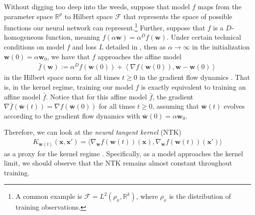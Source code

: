 \documentclass{article}
\begin{document}
Without digging too deep into the weeds, suppose that model $f$ maps from the parameter space $\mathbb{R}^p$ to Hilbert space $\mathcal{F}$ that represents  the space of possible functions our neural network can represent.\footnote{A common example is $\mathcal{F} = L^2(\rho_x, \mathbb{R}^k)$, where $\rho_x$ is the distribution of training observations.} Further, suppose that $f$ is a $D$-homogeneous function, meaning $f(\alpha \boldsymbol{w}) = \alpha^D f(\boldsymbol{w})$. Under certain technical conditions on model $f$ and loss $L$ detailed in \cite{chizat2018lazy}, then as $\alpha \rightarrow \infty$ in the initialization $\boldsymbol{w}(0) = \alpha \boldsymbol{w}_0$, we have that $f$ approaches the affine model 
\begin{align}\label{linearizedmodel}
    \bar{f}(\boldsymbol{w}) := \alpha^D f(\boldsymbol{w}(0)) + \left\langle \nabla f(\boldsymbol{w}(0)), \boldsymbol{w} - \boldsymbol{w}(0) \right\rangle
\end{align}
in the Hilbert space norm for all times $t \geq 0$ in the gradient flow dynamics \cite{chizat2018lazy}. That is, in the kernel regime, training our model $f$ is exactly equivalent to training an affine model $\bar{f}$. Notice that for this affine model $\bar{f}$, the gradient $\nabla \bar{f}(\bar{\boldsymbol{w}}(t)) = \nabla f(\bar{\boldsymbol{w}}(0))$ for all times $t \geq 0$, assuming that $\bar{\boldsymbol{w}}(t)$ evolves according to the gradient flow dynamics with $\bar{\boldsymbol{w}}(0) = \alpha \boldsymbol{w}_0$.

Therefore, we can look at the \textit{neural tangent kernel} (NTK)
\begin{align*}
    K_{\boldsymbol{w}(t)}(\boldsymbol{x}, \boldsymbol{x}') = \langle \nabla_{\boldsymbol{w}} f(\boldsymbol{w}(t))(\boldsymbol{x}), \nabla_{\boldsymbol{w}} f(\boldsymbol{w}(t))(\boldsymbol{x}') \rangle
\end{align*}
as a proxy for the kernel regime \cite{jacot2018neural}. Specifically, as a model approaches the kernel limit, we should observe that the NTK remains almost constant throughout training. 
\end{document}
